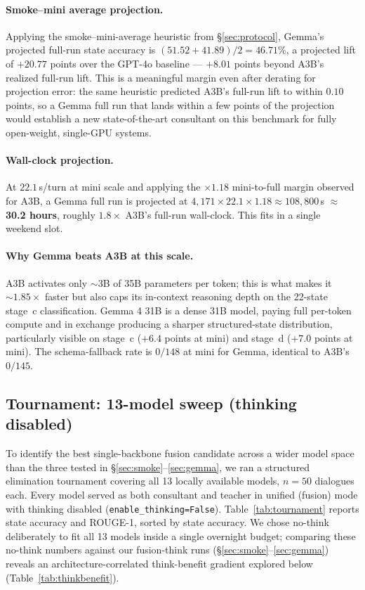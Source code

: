 \documentclass[11pt]{article}
\begin{document}
\paragraph{Smoke--mini average projection.} Applying the smoke--mini-average heuristic from \S\ref{sec:protocol}, Gemma's projected full-run state accuracy is $(51.52 + 41.89)/2 = 46.71\%$, a projected lift of $\boldsymbol{+20.77}$ points over the GPT-4o baseline --- $+8.01$ points beyond A3B's realized full-run lift. This is a meaningful margin even after derating for projection error: the same heuristic predicted A3B's full-run lift to within $0.10$ points, so a Gemma full run that lands within a few points of the projection would establish a new state-of-the-art consultant on this benchmark for fully open-weight, single-GPU systems.

\paragraph{Wall-clock projection.} At $22.1$\,s/turn at mini scale and applying the $\times 1.18$ mini-to-full margin observed for A3B, a Gemma full run is projected at $4{,}171 \times 22.1 \times 1.18 \approx 108{,}800$\,s $\approx$ \textbf{30.2 hours}, roughly $1.8\times$ A3B's full-run wall-clock. This fits in a single weekend slot.

\paragraph{Why Gemma beats A3B at this scale.} A3B activates only $\sim$3B of 35B parameters per token; this is what makes it $\sim 1.85\times$ faster but also caps its in-context reasoning depth on the 22-state stage~c classification. Gemma 4 31B is a dense 31B model, paying full per-token compute and in exchange producing a sharper structured-state distribution, particularly visible on stage~c ($+6.4$ points at mini) and stage~d ($+7.0$ points at mini). The schema-fallback rate is $0/148$ at mini for Gemma, identical to A3B's $0/145$.

\subsection{Tournament: 13-model sweep (thinking disabled)}
\label{sec:tournament}

To identify the best single-backbone fusion candidate across a wider model space than the three tested in \S\ref{sec:smoke}--\ref{sec:gemma}, we ran a structured elimination tournament covering all 13 locally available models, $n{=}50$ dialogues each. Every model served as both consultant and teacher in unified (fusion) mode with thinking disabled (\texttt{enable\_thinking=False}). Table~\ref{tab:tournament} reports state accuracy and ROUGE-1, sorted by state accuracy. We chose no-think deliberately to fit all 13 models inside a single overnight budget; comparing these no-think numbers against our fusion-think runs (\S\ref{sec:smoke}--\ref{sec:gemma}) reveals an architecture-correlated think-benefit gradient explored below (Table~\ref{tab:thinkbenefit}).
\end{document}
